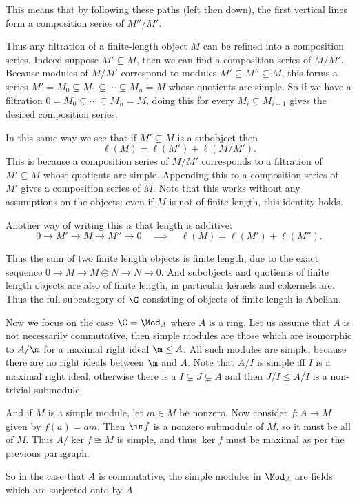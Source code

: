This means that by following these paths (left then down), the first vertical lines form a composition series of $M''/M'$.

Thus any filtration of a finite-length object $M$ can be refined into a composition series.
Indeed suppose $M'\subseteq M$, then we can find a composition series of $M/M'$.
Because modules of $M/M'$ correspond to modules $M'\subseteq M''\subseteq M$, this forms a series $M'=M_0\subsetneq M_1\subsetneq\cdots\subsetneq M_n=M$
whose quotients are simple.
So if we have a filtration $0=M_0\subsetneq\cdots\subsetneq M_n=M$, doing this for every $M_i\subsetneq M_{i+1}$ gives the desired composition series.

In this same way we see that if $M'\subseteq M$ is a subobject then
$$ \ell(M) = \ell(M') + \ell(M/M') . $$
This is because a composition series of $M/M'$ corresponds to a filtration of $M'\subseteq M$ whose quotients are simple.
Appending this to a composition series of $M'$ gives a composition series of $M$.
Note that this works without any assumptions on the objects: even if $M$ is not of finite length, this identity holds.

Another way of writing this is that length is additive:
$$ 0 \to M' \to M \to M'' \to 0 \quad\implies\quad \ell(M) = \ell(M') + \ell(M'') . $$

Thus the sum of two finite length objects is finite length, due to the exact sequence $0\to M\to M\oplus N\to N\to0$.
And subobjects and quotients of finite length objects are also of finite length, in particular kernels and cokernels are.
Thus the full subcategory of $\C$ consisting of objects of finite length is Abelian.

Now we focus on the case $\C=\Mod_A$ where $A$ is a ring.
Let us assume that $A$ is not necessarily commutative, then simple modules are those which are isomorphic to $A/\m$ for a maximal right ideal $\m\leq A$.
All such modules are simple, because there are no right ideals between $\m$ and $A$.
Note that $A/I$ is simple iff $I$ is a maximal right ideal, otherwise there is a $I\subsetneq J\subsetneq A$ and then $J/I\leq A/I$ is a non-trivial submodule.

And if $M$ is a simple module, let $m\in M$ be nonzero.
Now consider $f\colon A\to M$ given by $f(a)=am$.
Then $\im f$ is a nonzero submodule of $M$, so it must be all of $M$.
Thus $A/\ker f\cong M$ is simple, and thus $\ker f$ must be maximal as per the previous paragraph.

So in the case that $A$ is commutative, the simple modules in $\Mod_A$ are fields which are surjected onto by $A$.

